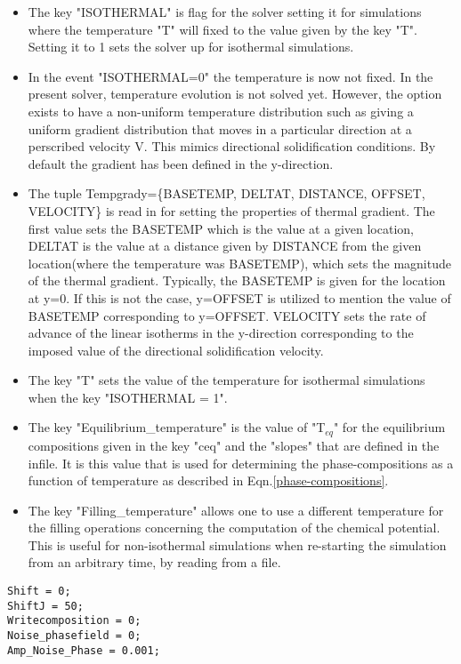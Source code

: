 \documentclass[a4paper,10pt]{article}
\begin{document}
\begin{itemize}
 \item The key "ISOTHERMAL" is flag for the solver setting it for simulations where the temperature "T" will fixed to the value given by the 
 key "T". Setting it to 1 sets the solver up for isothermal simulations.
 \item In the event "ISOTHERMAL=0" the temperature is now not fixed. In the present solver, temperature evolution is not solved yet. 
 However, the option exists to have a non-uniform temperature distribution such as giving a uniform gradient distribution that moves 
 in a particular direction at a perscribed velocity V. This mimics directional solidification conditions. By default the gradient 
 has been defined in the y-direction.
 \item The tuple Tempgrady=\{BASETEMP, DELTAT, DISTANCE, OFFSET, VELOCITY\} is read in for setting the properties of thermal gradient. 
 The first value sets the BASETEMP which is the value at a given location, DELTAT is the value at a distance given by DISTANCE from the given location(where the 
 temperature was BASETEMP), which sets the magnitude of the thermal gradient. Typically, the BASETEMP is given for the location at y=0. If this is not the 
 case, y=OFFSET is utilized to mention the value of BASETEMP corresponding to y=OFFSET. VELOCITY sets the rate of advance of the linear isotherms in the 
 y-direction corresponding to the imposed value of the directional solidification velocity.
 \item The key "T" sets the value of the temperature for isothermal simulations when the key "ISOTHERMAL = 1".
 \item The key "Equilibrium\_temperature" is the value of "T$_{eq}$" for the equilibrium compositions given in the key "ceq"
and the "slopes" that are defined in the infile. It is this value that is used for determining the phase-compositions as a function of temperature 
as described in Eqn.\ref{phase-compositions}.
\item The key "Filling\_temperature" allows one to use a different temperature for the filling operations concerning the computation of the chemical potential. 
This is useful for non-isothermal simulations when re-starting the simulation from an arbitrary time, by reading from a file. 
\end{itemize}

\begin{lstlisting}
Shift = 0;
ShiftJ = 50;
Writecomposition = 0;
Noise_phasefield = 0;
Amp_Noise_Phase = 0.001;
\end{lstlisting}
\end{document}
